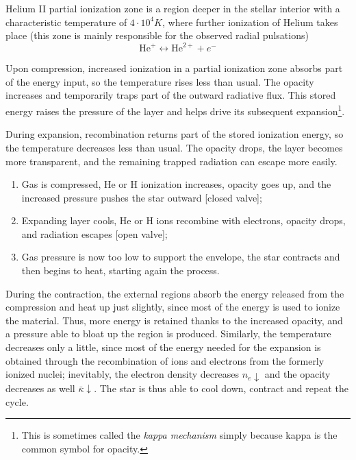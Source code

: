 Helium II partial ionization zone is a region deeper in the stellar interior with a characteristic temperature of $4\cdot 10^{4}\unit{K}$, where further ionization of Helium takes place (this zone is mainly responsible for the observed radial pulsations)
\begin{equation*}
    \text{He}^{+} \longleftrightarrow \text{He}^{2+}+e^{-}
\end{equation*}
\par Upon compression, increased ionization in a partial ionization zone absorbs part of the energy input, so the temperature rises less than usual. The opacity increases and temporarily traps part of the outward radiative flux. This stored energy raises the pressure of the layer and helps drive its subsequent expansion\footnote{This is sometimes called the \emph{kappa mechanism} simply because kappa is the common symbol for opacity.}.
\par During expansion, recombination returns part of the stored ionization energy, so the temperature decreases less than usual. The opacity drops, the layer becomes more transparent, and the remaining trapped radiation can escape more easily.
\begin{tcolorbox}[enhanced,attach boxed title to top center={yshift=-3mm,yshifttext=-1mm},
  colback=blue!5!white,colframe=blue!75!black,colbacktitle=blue!80!black,
  title=Opacity Valve,
  boxed title style={size=small,colframe=blue!50!black}]
  \begin{enumerate}
    \item Gas is compressed, He or H ionization increases, opacity goes up, and the increased pressure pushes the star outward [closed valve];
    \item Expanding layer cools, He or H ions recombine with electrons, opacity drops, and radiation escapes [open valve];
    \item Gas pressure is now too low to support the envelope, the star contracts and then begins to heat, starting again the process.
  \end{enumerate}
  During the contraction, the external regions absorb the energy released from the compression and heat up just slightly, since most of the energy is used to ionize the material. Thus, more energy is retained thanks to the increased opacity, and a pressure able to bloat up the region is produced. Similarly, the temperature decreases only a little, since most of the energy needed for the expansion is obtained through the recombination of ions and electrons from the formerly ionized nuclei; inevitably, the electron density decreases $n_{e}\downarrow$ and the opacity decreases as well $\bar{\kappa}\downarrow$. The star is thus able to cool down, contract and repeat the cycle.
\end{tcolorbox}
